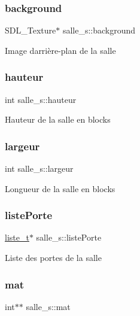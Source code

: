 \subsubsection{\texorpdfstring{background}{background}}
{\footnotesize\ttfamily S\+D\+L\+\_\+\+Texture$\ast$ salle\+\_\+s\+::background}

Image d\textquotesingle{}arrière-\/plan de la salle \mbox{\label{structsalle__s_a2be13fedfc5f31bc7f02c65af7d95c7a}} 
\subsubsection{\texorpdfstring{hauteur}{hauteur}}
{\footnotesize\ttfamily int salle\+\_\+s\+::hauteur}

Hauteur de la salle en blocks \mbox{\label{structsalle__s_ac1273e8d176620c3b9130d2f1e741315}} 
\subsubsection{\texorpdfstring{largeur}{largeur}}
{\footnotesize\ttfamily int salle\+\_\+s\+::largeur}

Longueur de la salle en blocks \mbox{\label{structsalle__s_a8c3b513a26b2418863a37bfd91f86b11}} 
\subsubsection{\texorpdfstring{liste\+Porte}{listePorte}}
{\footnotesize\ttfamily \hyperlink{structliste__s}{liste\+\_\+t}$\ast$ salle\+\_\+s\+::liste\+Porte}

Liste des portes de la salle \mbox{\label{structsalle__s_ad9934630b58b551f8f185dead2006ba6}} 
\subsubsection{\texorpdfstring{mat}{mat}}
{\footnotesize\ttfamily int$\ast$$\ast$ salle\+\_\+s\+::mat}

